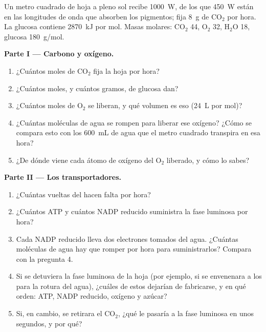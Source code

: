 \begin{problem}
\label{pb:g12:photosynthesis:1}
Un metro cuadrado de hoja a pleno sol recibe \qty{1000}{W}, de los que
\qty{450}{W} están en las longitudes de onda que absorben los
pigmentos; fija \qty{8}{g} de $\mathrm{CO_2}$ por hora. La glucosa
contiene \qty{2870}{kJ} por mol. Masas molares: $\mathrm{CO_2}$ 44,
$\mathrm{O_2}$ 32, $\mathrm{H_2O}$ 18, glucosa \qty{180}{g/mol}.

\medskip
\noindent\textbf{Parte I --- Carbono y oxígeno.}
\begin{enumerate}
  \item ¿Cuántos moles de $\mathrm{CO_2}$ fija la hoja por hora?
  \item ¿Cuántos moles, y cuántos gramos, de glucosa dan?
  \item ¿Cuántos moles de $\mathrm{O_2}$ se liberan, y qué volumen es
        eso (\qty{24}{L} por mol)?
  \item ¿Cuántas moléculas de agua se rompen para liberar ese oxígeno?
        ¿Cómo se compara esto con los \qty{600}{mL} de agua que el
        metro cuadrado transpira en esa hora?
  \item ¿De dónde viene cada átomo de oxígeno del $\mathrm{O_2}$
        liberado, y cómo lo sabes?
\end{enumerate}

\medskip
\noindent\textbf{Parte II --- Los transportadores.}
\begin{enumerate}[resume]
  \item ¿Cuántas vueltas del  hacen falta por hora?
  \item ¿Cuántos ATP y cuántos NADP reducido suministra la fase
        luminosa por hora?
  \item Cada NADP reducido lleva dos electrones tomados del agua.
        ¿Cuántas moléculas de agua hay que romper por hora para
        suministrarlos? Compara con la pregunta 4.
  \item Si se detuviera la fase luminosa de la hoja (por ejemplo, si se
        envenenara a los  para la rotura del agua), ¿cuáles
        de estos dejarían de fabricarse, y en qué orden: ATP, NADP
        reducido, oxígeno y azúcar?
  \item Si, en cambio, se retirara el $\mathrm{CO_2}$, ¿qué le pasaría
        a la fase luminosa en unos segundos, y por qué?
\end{enumerate}


\end{problem}
